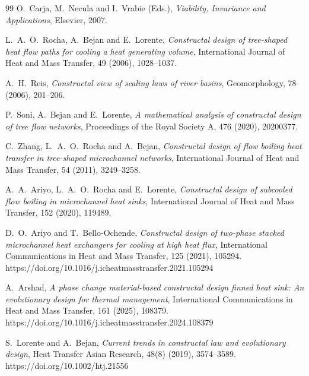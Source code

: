 \documentclass[12pt]{article}
\theoremstyle{plain}
\theoremstyle{definition}
\theoremstyle{remark}
\begin{document}
\begin{thebibliography}{99}
O.~Carja, M.~Necula and I.~Vrabie (Eds.),
\emph{Viability, Invariance and Applications},
Elsevier, 2007.





L.~A.~O.~Rocha, A.~Bejan and E.~Lorente,
\emph{Constructal design of tree-shaped heat flow paths for cooling a heat generating volume},
International Journal of Heat and Mass Transfer, 49 (2006), 1028--1037.

A.~H.~Reis,
\emph{Constructal view of scaling laws of river basins},
Geomorphology, 78 (2006), 201--206.

P.~Soni, A.~Bejan and E.~Lorente,
\emph{A mathematical analysis of constructal design of tree flow networks},
Proceedings of the Royal Society A, 476 (2020), 20200377.

C.~Zhang, L.~A.~O.~Rocha and A.~Bejan,
\emph{Constructal design of flow boiling heat transfer in tree-shaped microchannel networks},
International Journal of Heat and Mass Transfer, 54 (2011), 3249--3258.

A.~A.~Ariyo, L.~A.~O.~Rocha and E.~Lorente,
\emph{Constructal design of subcooled flow boiling in microchannel heat sinks},
International Journal of Heat and Mass Transfer, 152 (2020), 119489.


D.~O.~Ariyo and T.~Bello-Ochende,
\emph{Constructal design of two-phase stacked microchannel heat exchangers for cooling at high heat flux},
International Communications in Heat and Mass Transfer, 125 (2021), 105294.
https://doi.org/10.1016/j.icheatmasstransfer.2021.105294



A.~Arshad,
\emph{A phase change material-based constructal design finned heat sink: An evolutionary design for thermal management},
International Communications in Heat and Mass Transfer, 161 (2025), 108379.
https://doi.org/10.1016/j.icheatmasstransfer.2024.108379

S.~Lorente and A.~Bejan,
\emph{Current trends in constructal law and evolutionary design},
Heat Transfer Asian Research, 48(8) (2019), 3574--3589.
https://doi.org/10.1002/htj.21556


\end{thebibliography}
\end{document}
